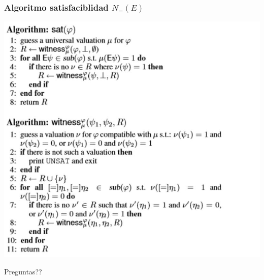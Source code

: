 \documentclass{beamer}
\begin{document}
\begin{frame}[fragile]
\frametitle{Algoritmo satisfaciblidad $N_{=}(E)$}

\includegraphics[height=\textheight]{satalgorithm.JPG}

\end{frame}

\begin{frame}
\Huge{\centerline{Preguntas??}}
\end{frame}

\end{document}
